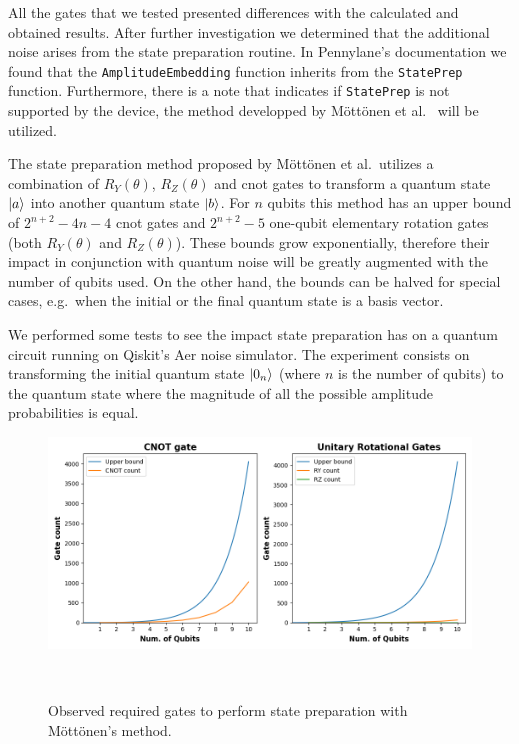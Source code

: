All the gates that we tested presented differences with the
calculated and obtained results. After further investigation
we determined that the additional noise arises from the state
preparation routine. In Pennylane's documentation we found that
the \colorbox{inline_gray}{\lstinline|AmplitudeEmbedding|} function
inherits from the \colorbox{inline_gray}{\lstinline|StatePrep|}
function. Furthermore, there is a note that indicates
if \colorbox{inline_gray}{\lstinline|StatePrep|} is not supported
by the device, the method developped by Möttönen et al.~\cite{mottonen_transformation_2004}
will be utilized. \

The state preparation method proposed by Möttönen et al.\ utilizes a
combination of \(R_{Y}(\theta)\), \(R_{Z}(\theta)\) and \ac{cnot}
gates to transform a quantum state \(\ket{a}\) into another quantum state
\(\ket{b}\). For \(n\) qubits this method has an upper bound of
\(2^{n+2}-4n-4\) \ac{cnot} gates and \(2^{n+2}-5\) one-qubit elementary
rotation gates (both \(R_{Y}(\theta)\) and \(R_{Z}(\theta)\)). These
bounds grow exponentially, therefore their impact in conjunction with
quantum noise will be greatly augmented with the number of qubits used.
On the other hand, the bounds can be halved for special cases, e.g.\ when
the initial or the final quantum state is a basis vector. \

We performed some tests to see the impact state preparation has on
a quantum circuit running on Qiskit's Aer noise simulator. The experiment
consists on transforming the initial quantum state \(\ket{0_{n}}\)
(where \(n\) is the number of qubits) to the quantum state where the
magnitude of all the possible amplitude probabilities is equal. \

\begin{figure}[h!]
  \includegraphics[scale=0.55]{figures/state-prep-gates-count.png}
  \centering
  \caption{Observed required gates to perform state preparation with Möttönen's method.}
~\label{fig:state_prep}
\end{figure} \

